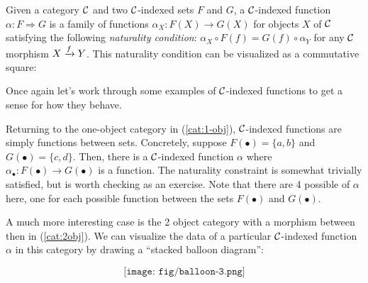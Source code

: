 \begin{definition}
  \sloppy
  Given a category $\mathcal C$ and two $\mathcal C$-indexed sets $F$ and $G$, 
  a $\mathcal C$-indexed function $\alpha : F \Rightarrow G$ 
  is a family of functions $\alpha_X : F(X) \to G(X)$ for objects $X$ 
  of $\mathcal C$ satisfying the following \emph{naturality condition}:
  $\alpha_X \circ F(f) = G(f) \circ \alpha_Y$
  for any $\mathcal C$ morphism $X \xrightarrow{f} Y$.
  This naturality condition can be visualized as a commutative square:
  \begin{center}
  \end{center}
\end{definition}

Once again let's work through some examples of $\mathcal C$-indexed functions
to get a sense for how they behave.

Returning to the one-object category in (\ref{cat:1-obj}), $\mathcal C$-indexed functions are simply
functions between sets. Concretely, suppose $F(\bullet) = \{a, b\}$ and
$G(\bullet) = \{c, d\}$. Then, there is a $\mathcal C$-indexed function $\alpha$ 
where $\alpha_\bullet : F(\bullet) \to G(\bullet)$ is a function. The naturality
constraint is somewhat trivially satisfied, but is worth checking as an
exercise. Note that there are 4 possible of $\alpha$ here, one for each possible 
function between the sets $F(\bullet)$ and $G(\bullet)$.

A much more interesting case is the 2 object category with a morphism between 
then in (\ref{cat:2obj}). We can visualize the data 
of a particular $\mathcal C$-indexed function $\alpha$ in this category 
by drawing a ``stacked balloon diagram'':

\begin{equation}
\texttt{[image: fig/balloon-3.png]}
\label{fig:2balloon}
\end{equation}

